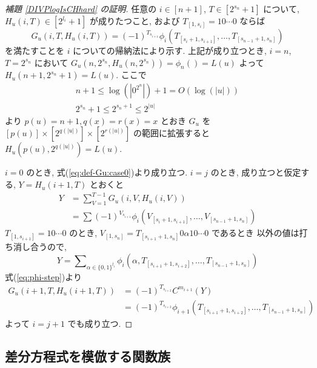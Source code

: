 \begin{proof}[\rm 補題 \ref{DIVPlogIsCHhard} の証明]
 任意の $i \in [n+1]$, $T \in [2^{s_n}+1]$ について,
 $H_u(i,T) \in [2^{l_i}+1]$ が成りたつこと,
 および $T_{[1,s_i]} = 10 \cdots 0$ ならば
 \begin{equation} \label{eq:subformula}
  G_u(i,T,H_u(i,T)) = (-1)^{T_{s_{i+1}}} 
   \phi_i(T_{[s_i+1, s_{i+1}]}, \dots, T_{[s_{n-1}+1, s_n]})
 \end{equation}
 を満たすことを $i$ についての帰納法により示す.
 上記が成り立つとき,
 $i=n$, $T=2^{s_n}$ において $G_u(n, 2^{s_n}, H_u(n,2^{s_n})) = \phi_n() = L(u)$
 よって $H_u(n+1, 2^{s_n}+1) = L(u)$.
 ここで 
 \begin{gather}
  n+1 \le \log(|0^{2^n}|) + 1 = O(\log(|u|)) \\
  2^{s_n}+1 \le 2^{s_n+1} \le 2^{|u|}
 \end{gather}
 より $p(u) = n+1, q(x) = r(x) = x$ とおき $G_u$ を
 $[p(u)] \times [2^{q(|u|)}] \times [2^{r(|u|)}]$ の範囲に拡張すると
 $H_u(p(u), 2^{q(|u|)}) = L(u)$.

 $i=0$ のとき, 式(\ref{eq:def-Gu:case0})より成り立つ.
 $i=j$ のとき, 成り立つと仮定する, $Y = H_u(i+1, T)$ とおくと
 \begin{align}
  Y 
  &= \sum_{V = 1}^{T-1} G_u(i, V, H_u(i, V)) \\
  &= \sum (-1)^{V_{s_{i+1}}} \phi_i(V_{[s_i+1, s_{i+1}]}, 
   \dots, V_{[s_{n-1}+1, s_n]})
 \end{align}
 $T_{[1, s_{i+1}]} = 10 \cdots 0$ のとき,
 $V_{[1, s_n]} = T_{[s_{i+1}+1,s_n]} 0 \alpha 1 0 \cdots 0$ であるとき
 以外の値は打ち消し合うので,
 \begin{equation}
  Y = \sum\nolimits_{\alpha \in \{0,1\}^{l_i}} 
  \phi_i(\alpha, T_{[s_{i+1}+1, s_{i+2}]}, \dots, T_{[s_{n-1}+1, s_n]})
 \end{equation}
 式(\ref{eq:phi-step})より
 \begin{align}
  G_u(i+1,T,H_u(i+1,T)) 
  &= (-1)^{T_{s_{i+2}}} C^{m_{i+1}} (Y)\\
  &= (-1)^{T_{s_{i+2}}} \phi_{i+1}(T_{[s_{i+1}+1, s_{i+2}]}, \dots, T_{[s_{n-1}+1, s_n]})
 \end{align}
 よって $i=j+1$ でも成り立つ.
 \end{proof}



\subsection{差分方程式を模倣する関数族}

